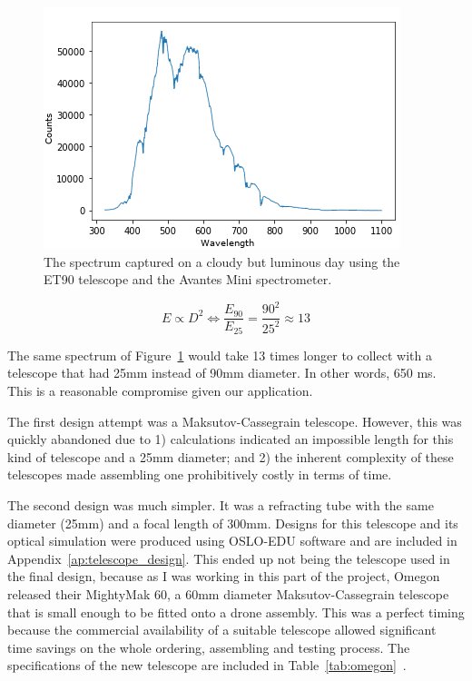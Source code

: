 \begin{figure}[htpb]
    \centering
    \includegraphics[width=\textwidth]{img/png/ex_spectrum.png}
    \caption{The spectrum captured on a cloudy but luminous day using
    the ET90 telescope and the Avantes Mini spectrometer.}%
    \label{fig:cloudy_but_luminous_day}
\end{figure}

\begin{equation}
    \label{eq:light_capture}
    E \propto D^2 \Leftrightarrow \frac{E_{90}}{E_{25}} =
    \frac{90^2}{25^2} \approx 13
\end{equation}

The same spectrum of Figure~\ref{fig:cloudy_but_luminous_day} would take
13 times longer to collect with a telescope that had 25mm instead of
90mm diameter. In other words, 650 ms. This is a reasonable compromise
given our application.

The first design attempt was a Maksutov-Cassegrain telescope. However,
this was quickly abandoned due to 1) calculations indicated an
impossible length for this kind of telescope and a 25mm diameter; and 2)
the inherent complexity of these telescopes made assembling one
prohibitively costly in terms of time.

The second design was much simpler. It was a refracting tube with the
same diameter (25mm) and a focal length of 300mm. Designs for this
telescope and its optical simulation were produced using OSLO-EDU
software and are included in Appendix~\ref{ap:telescope_design}. This
ended up not being the telescope used in the final design, because as I
was working in this part of the project, Omegon released their MightyMak
60, a 60mm diameter Maksutov-Cassegrain telescope that is small enough
to be fitted onto a drone assembly. This was a perfect timing because
the commercial availability of a suitable telescope allowed significant
time savings on the whole ordering, assembling and testing process. The
specifications of the new telescope are included in
Table~\ref{tab:omegon}~\cite{Omegon2021}.

